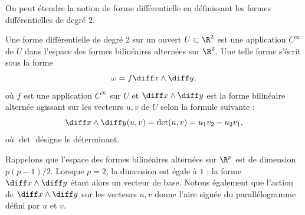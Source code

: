 %
%
On peut étendre la notion de forme différentielle en définissant les formes différentielles de degré $2$. 
\begin{fdefn}
Une forme différentielle de degré $2$ sur un ouvert $U \subset \R^2$ est une application $C^\infty$ de $U$ dans l'espace des formes bilinéaires alternées sur $\R^2$. Une telle forme s'écrit sous la forme
\[\omega=f \diff x \wedge \diff y,\]
où $f$ est une application $C^\infty$ sur $U$ et $\diff x \wedge \diff y$ est la forme bilinéaire alternée agissant sur les vecteurs $u, v$ de $U$ selon la formule suivante :
\[\diff x \wedge \diff y (u,v) = \det(u,v)=u_1v_2 - u_2v_1,\]
où $\det$ désigne le déterminant. 
\end{fdefn}

Rappelons que l'espace des formes bilinéaires alternées sur $\R^p$ est de dimension $p(p-1)/2$. Lorsque $p=2$, la dimension est égale à $1$ ; la forme $\diff x \wedge \diff y$ étant alors un vecteur de base. Notons également que l'action de $\diff x \wedge \diff y$ sur les vecteurs $u,v$ donne l'aire signée du parallélogramme défini par $u$ et $v$.

